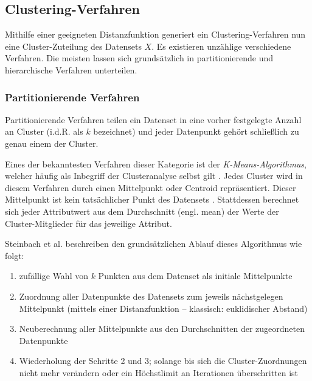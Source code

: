 \hypertarget{clustering-verfahren}{%
\subsection{Clustering-Verfahren}\label{clustering-verfahren}}

Mithilfe einer geeigneten Distanzfunktion generiert ein
Clustering-Verfahren nun eine Cluster-Zuteilung des Datensets \(X\). Es
existieren unzählige verschiedene Verfahren. Die meisten lassen sich
grundsätzlich in partitionierende und hierarchische Verfahren
unterteilen. \autocite[ Kap. 1.3 Which Clustering Algorithm to
Choose]{kaufman2009}

\hypertarget{partitionierende-verfahren}{%
\subsubsection{Partitionierende
Verfahren}\label{partitionierende-verfahren}}

Partitionierende Verfahren teilen ein Datenset in eine vorher
festgelegte Anzahl an Cluster (i.d.R. als \(k\) bezeichnet) und jeder
Datenpunkt gehört schließlich zu genau einem der Cluster. \autocite[
Kap. 1.3.1 Partitioning Methods]{kaufman2009}

Eines der bekanntesten Verfahren dieser Kategorie ist der
\emph{K-Means-Algorithmus}, welcher häufig als Inbegriff der
Clusteranalyse selbst gilt \autocite{huang1998}. Jedes Cluster wird in
diesem Verfahren durch einen Mittelpunkt oder Centroid repräsentiert.
Dieser Mittelpunkt ist kein tatsächlicher Punkt des Datensets
\autocite{steinbach2000}. Stattdessen berechnet sich jeder Attributwert
aus dem Durchschnitt (engl. mean) der Werte der Cluster-Mitglieder für
das jeweilige Attribut. \autocite[ Kap. 4.5 K-Means Algorithm]{king2015}

Steinbach et al. \autocite{steinbach2000} beschreiben den
grundsätzlichen Ablauf dieses Algorithmus wie folgt:

\begin{enumerate}
\def\labelenumi{\arabic{enumi}.}
\tightlist
\item
  zufällige Wahl von \(k\) Punkten aus dem Datenset als initiale
  Mittelpunkte
\item
  Zuordnung aller Datenpunkte des Datensets zum jeweils nächstgelegen
  Mittelpunkt (mittels einer Distanzfunktion -- klassisch: euklidischer
  Abstand)
\item
  Neuberechnung aller Mittelpunkte aus den Durchschnitten der
  zugeordneten Datenpunkte
\item
  Wiederholung der Schritte 2 und 3; solange bis sich die
  Cluster-Zuordnungen nicht mehr verändern oder ein Höchstlimit an
  Iterationen überschritten ist
\end{enumerate}

